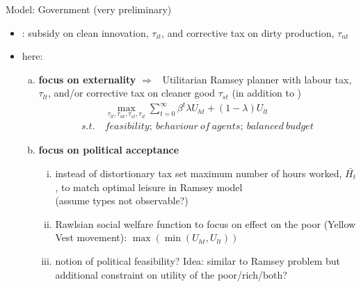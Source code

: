 \documentclass[11pt,aspectratio=169]{beamer}
\newcommand{\ar}{$\Rightarrow$ \ }
\begin{document}
\begin{frame}{Model: Government (very preliminary)}
	\vspace{-2mm}
	\begin{itemize}
\item<+-> 
\cite{Acemoglu2012TheChange}: subsidy on clean innovation, $\tau_{it}$, and corrective tax on dirty production, $\tau_{nt}$
\item<+-> here:

\begin{enumerate}[a)]
	\item \textbf{focus on externality} \ar Utilitarian Ramsey planner with  labour tax, $\tau_{lt}$, and/or corrective tax on cleaner good $\tau_{st}$ (in addition to \cite{Acemoglu2012TheChange})
	\vspace{-3mm}
	\begin{align*}
	&\underset{\tau_{lt}, \tau_{nt}, \tau_{st}, \tau_{it}}{\max}\sum_{t=0}^{\infty}\beta^t \lambda U_{ht}+(1-\lambda)U_{lt}\\
	s.t.\ & feasibility;\ behaviour\  of\  agents; \  balanced\ budget
	\end{align*}
	\vspace{-5mm}
	\item<+-> \textbf{focus on political acceptance}
	\begin{enumerate}[i)]
		\item<+-> instead of distortionary tax set maximum number of hours worked,  $\bar{H_t}$, to match optimal leisure in Ramsey model\\ (assume types not observable?)
		\item<+-> Rawlsian social welfare function to focus on effect on the poor (Yellow Vest movement): $\max(\min(U_{ht}, U_{lt}))$ 
		\item<+-> \alert{notion of political feasibility?} Idea: similar to Ramsey problem but additional constraint on utility of the poor/rich/both?
	\end{enumerate}
	
\end{enumerate}

	\end{itemize}
\end{frame}
\end{document}

